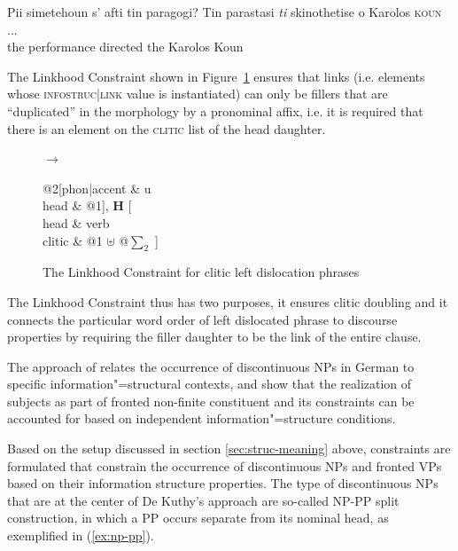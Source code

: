 \documentclass[output=paper]{langsci/langscibook}
\begin{document}
\begin{exe}
  \ex\label{ex:clld-greek}
  \begin{xlist}
    \ex Pii simetehoun s' afti tin paragogi?
    \ex \gll Tin parastasi \textit{ti} skinothetise o Karolos \textsc{koun} ...\\
              the performance {} directed the Karolos Koun\\
  \end{xlist}

\end{exe}

The Linkhood Constraint shown in Figure~\ref{fig:clld-constraint}
ensures that links (i.e. elements whose \textsc{infostruc|link} value
is instantiated) can only be fillers that are ``duplicated'' in the
morphology by a pronominal affix, i.e. it is required that there is an
element on the \textsc{clitic} list of the head daughter.

\begin{figure}[htb]
  \centering
  \begin{avm}
  \end{avm}
$\to$\ 
\begin{avm}
  @2[phon|accent & u\\
     head & @1], \textbf{H} [\\
                              head & verb\\
                              clitic & {@1} $\uplus$ @{$\sum_2$} ]
\end{avm}
  \caption{The Linkhood Constraint for clitic left dislocation phrases}
  \label{fig:clld-constraint}
\end{figure}

The Linkhood Constraint thus has two purposes, it ensures clitic
doubling and it connects the particular word order of left dislocated
phrase to discourse properties by requiring the filler daughter to be
the link of the entire clause.

The approach of \cite{deKuthy2002a} relates
the occurrence of discontinuous NPs in German to specific
information"=structural contexts, and \citet{dKM2003a}
show that the realization of subjects as part of fronted non-finite
constituent and its constraints can be accounted for based on
independent information"=structure conditions.

Based on the setup discussed in section \ref{sec:struc-meaning} above,
constraints are formulated that constrain the occurrence of
discontinuous NPs and fronted VPs based on their information structure
properties. The type of discontinuous NPs that are at the center of De
Kuthy's approach are so-called NP-PP split construction, in which a PP
occurs separate from its nominal head, as exemplified in
(\ref{ex:np-pp}).
\end{document}
